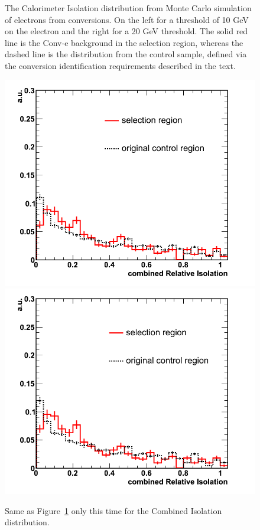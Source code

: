 \begin{figure}[h!]
\caption{The Calorimeter Isolation distribution from Monte Carlo simulation of electrons from conversions.   On the left for a threshold of 10 GeV on the electron and the right for a 20 GeV threshold.  The solid red line is the Conv-e background in the selection region, whereas the dashed line is the distribution from the control sample, defined via the conversion identification requirements described in the text.}\label{fig:caloIso_conv}
\end{figure}

\begin{figure}[h!]
\centering
\includegraphics[scale=0.28]{Plots/combIso_pt10_conv.png}
\includegraphics[scale=0.28]{Plots/combIso_pt20_conv.png}
\caption{Same as Figure~\ref{fig:caloIso_conv} only this time for the Combined Isolation distribution.}\label{fig:combIso_conv}
\end{figure}

